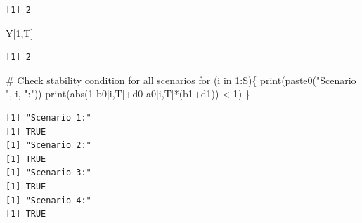 \documentclass[
  letterpaper,
  DIV=11,
  numbers=noendperiod]{scrreprt}
\newenvironment{Shaded}{\begin{snugshade}}{\end{snugshade}}
\newcommand{\CommentTok}[1]{\textcolor[rgb]{0.37,0.37,0.37}{#1}}
\newcommand{\ControlFlowTok}[1]{\textcolor[rgb]{0.00,0.23,0.31}{#1}}
\newcommand{\DecValTok}[1]{\textcolor[rgb]{0.68,0.00,0.00}{#1}}
\newcommand{\FunctionTok}[1]{\textcolor[rgb]{0.28,0.35,0.67}{#1}}
\newcommand{\NormalTok}[1]{\textcolor[rgb]{0.00,0.23,0.31}{#1}}
\newcommand{\SpecialCharTok}[1]{\textcolor[rgb]{0.37,0.37,0.37}{#1}}
\newcommand{\StringTok}[1]{\textcolor[rgb]{0.13,0.47,0.30}{#1}}
\begin{document}
\begin{verbatim}
[1] 2
\end{verbatim}

\begin{Shaded}
\begin{Highlighting}[]
\NormalTok{Y[}\DecValTok{1}\NormalTok{,T]}
\end{Highlighting}
\end{Shaded}

\begin{verbatim}
[1] 2
\end{verbatim}

\begin{Shaded}
\begin{Highlighting}[]
\CommentTok{\# Check stability condition for all scenarios}
\ControlFlowTok{for}\NormalTok{ (i }\ControlFlowTok{in} \DecValTok{1}\SpecialCharTok{:}\NormalTok{S)\{}
\FunctionTok{print}\NormalTok{(}\FunctionTok{paste0}\NormalTok{(}\StringTok{"Scenario "}\NormalTok{, i, }\StringTok{":"}\NormalTok{))}
\FunctionTok{print}\NormalTok{(}\FunctionTok{abs}\NormalTok{(}\DecValTok{1}\SpecialCharTok{{-}}\NormalTok{b0[i,T]}\SpecialCharTok{+}\NormalTok{d0}\SpecialCharTok{{-}}\NormalTok{a0[i,T]}\SpecialCharTok{*}\NormalTok{(b1}\SpecialCharTok{+}\NormalTok{d1)) }\SpecialCharTok{\textless{}} \DecValTok{1}\NormalTok{)}
\NormalTok{\}}
\end{Highlighting}
\end{Shaded}

\begin{verbatim}
[1] "Scenario 1:"
[1] TRUE
[1] "Scenario 2:"
[1] TRUE
[1] "Scenario 3:"
[1] TRUE
[1] "Scenario 4:"
[1] TRUE
\end{verbatim}
\end{document}
